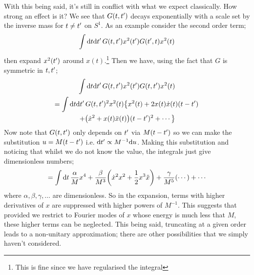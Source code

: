 With this being said, it's still in conflict with what we expect classically. How strong an effect is it? We see that $G(t, t^{\prime})$ decays exponentially with a scale set by the inverse mass for $t \neq t^{\prime}$ on $S^{1}$. As an example consider the second order term;
\begin{equation*}
\int{\ud t \upd{t\pr} G\left(t, t\pr\right)x^2(t\pr) G(t\pr, t)x^{2}(t)}
\end{equation*}
then expand $x^{2}(t^{\prime})$ around $x(t)$.\footnote{This is fine since we have regularised the integral} Then we have, using the fact that $G$ is symmetric in $t, t^{\prime}$;
\begin{multline*}
\int{\ud t\upd{t\pr} G(t, t\pr)x^2(t\pr)G(t, t\pr)x^{2}(t)} \\ = \int{\ud t \upd{t\pr} G(t, t\pr)^2 x^{2}(t)}  \left\{x^2(t) + 2x(t)\dot{x}(t)(t - t\pr)\right.  \\ \left.+ \left(\dot{x}^2 + x(t)\ddot{x}(t)\right)(t - t\pr)^2 + \cdots\right\}
\end{multline*}
Now note that $G(t, t^{\prime})$ only depends on $t^{\prime}$ via $M(t - t^{\prime})$ so we can make the substitution $u = M(t - t^{\prime})$ i.e. $\text{d} t^{\prime} \propto M^{-1}\text{d} u$. Making this substitution and noticing that whilst we do not know the value, the integrals just give dimensionless numbers;
\begin{equation*}
= \int{\upd{t}\frac{\alpha}{M}x^{4} + \frac{\beta}{M^3}\left(\dot{x}^2 x^2 + \frac{1}{2}x^3 \ddot{x}\right) + \frac{\gamma}{M^5}\left(\cdots\right) + \cdots}
\end{equation*}
where $\alpha, \beta, \gamma, \ldots$ are dimensionless. So in the expansion, terms with higher derivatives of $x$ are suppressed with higher powers of $M^{-1}$. This suggests that provided we restrict to Fourier modes of $x$ whose energy is much less that $M$, these higher terms can be neglected. This being said, truncating at a given order leads to a non-unitary approximation; there are other possibilities that we simply haven't considered. 
